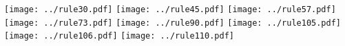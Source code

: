 \documentclass{standalone}
\begin{document}
    \texttt{[image: ../rule30.pdf]}%
    \texttt{[image: ../rule45.pdf]}%
    \texttt{[image: ../rule57.pdf]}%
    \texttt{[image: ../rule73.pdf]}%
    \texttt{[image: ../rule90.pdf]}%
    \texttt{[image: ../rule105.pdf]}%
    \texttt{[image: ../rule106.pdf]}%
    \texttt{[image: ../rule110.pdf]}%
\end{document}

